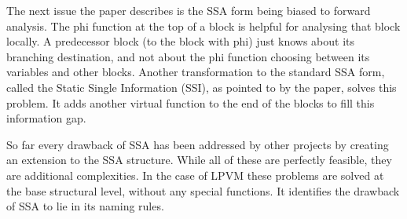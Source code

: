 The next issue the paper describes is the SSA form being biased to forward
analysis. The phi function at the top of a block is helpful for analysing that
block locally. A predecessor block (to the block with phi) just knows about its
branching destination, and not about the phi function choosing between its
variables and other blocks. Another transformation to the standard SSA form,
called the Static Single Information (SSI), as pointed to by the paper, solves
this problem. It adds another virtual function to the end of the blocks to fill
this information gap. 

So far every drawback of SSA has been addressed by other projects by creating
an extension to the SSA structure. While all of these are perfectly feasible,
they are additional complexities. In the case of LPVM these problems are solved
at the base structural level, without any special functions. It identifies the
drawback of SSA to lie in its naming rules. 












